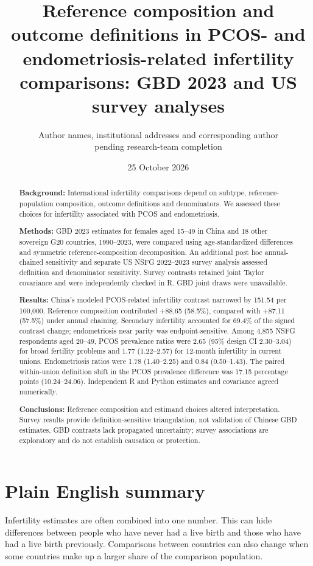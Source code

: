 \documentclass[11pt,a4paper]{article}
\title{Reference composition and outcome definitions in PCOS- and endometriosis-related infertility comparisons: GBD 2023 and US survey analyses}
\author{\parbox{0.9\textwidth}{\centering Author names, institutional addresses and corresponding author\\pending research-team completion}}
\date{25 October 2026}
\begin{document}
\maketitle
\linenumbers
\begin{abstract}
\noindent\textbf{Background:} International infertility comparisons depend on subtype, reference-population composition, outcome definitions and denominators. We assessed these choices for infertility associated with PCOS and endometriosis.

\noindent\textbf{Methods:} GBD 2023 estimates for females aged 15--49 in China and 18 other sovereign G20 countries, 1990--2023, were compared using age-standardized differences and symmetric reference-composition decomposition. An additional post hoc annual-chained sensitivity and separate US NSFG 2022--2023 survey analysis assessed definition and denominator sensitivity. Survey contrasts retained joint Taylor covariance and were independently checked in R. GBD joint draws were unavailable.

\noindent\textbf{Results:} China's modeled PCOS-related infertility contrast narrowed by 151.54 per 100,000. Reference composition contributed +88.65 (58.5\%), compared with +87.11 (57.5\%) under annual chaining. Secondary infertility accounted for 69.4\% of the signed contrast change; endometriosis near parity was endpoint-sensitive. Among 4,855 NSFG respondents aged 20--49, PCOS prevalence ratios were 2.65 (95\% design CI 2.30--3.04) for broad fertility problems and 1.77 (1.22--2.57) for 12-month infertility in current unions. Endometriosis ratios were 1.78 (1.40--2.25) and 0.84 (0.50--1.43). The paired within-union definition shift in the PCOS prevalence difference was 17.15 percentage points (10.24--24.06). Independent R and Python estimates and covariance agreed numerically.

\noindent\textbf{Conclusions:} Reference composition and estimand choices altered interpretation. Survey results provide definition-sensitive triangulation, not validation of Chinese GBD estimates. GBD contrasts lack propagated uncertainty; survey associations are exploratory and do not establish causation or protection.
\end{abstract}

\section*{Plain English summary}
Infertility estimates are often combined into one number. This can hide differences between people who have never had a live birth and those who have had a live birth previously. Comparisons between countries can also change when some countries make up a larger share of the comparison population.
\end{document}

